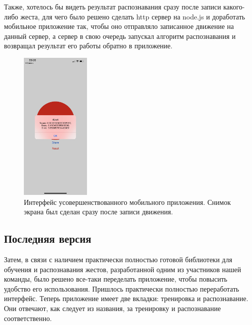 Также, хотелось бы видеть результат распознавания сразу после записи какого-либо жеста, для чего было решено сделать http сервер на node.js и доработать мобильное приложение так, чтобы оно отправляло записанное движение на данный сервер, а сервер в свою очередь запускал алгоритм распознавания и возвращал результат его работы обратно в приложение.


\begin{figure}[H]
    \begin{center}
        \includegraphics[width=0.3\textwidth]{max_kt2_images/image5.jpg}
    \end{center}
    \caption{Интерфейс усовершенствованного мобильного приложения. Снимок экрана был сделан сразу после записи движения.}
\end{figure}

\subsection{Последняя версия}
Затем, в связи с наличием практически полностью готовой библиотеки для обучения и распознавания жестов, разработанной одним из участников нашей команды, было решено все-таки переделать приложение, чтобы повысить удобство его использования. Пришлось практически полностью переработать интерфейс. Теперь приложение имеет две вкладки: тренировка и распознавание. Они отвечают, как следует из названия, за тренировку и распознавание соответственно.

